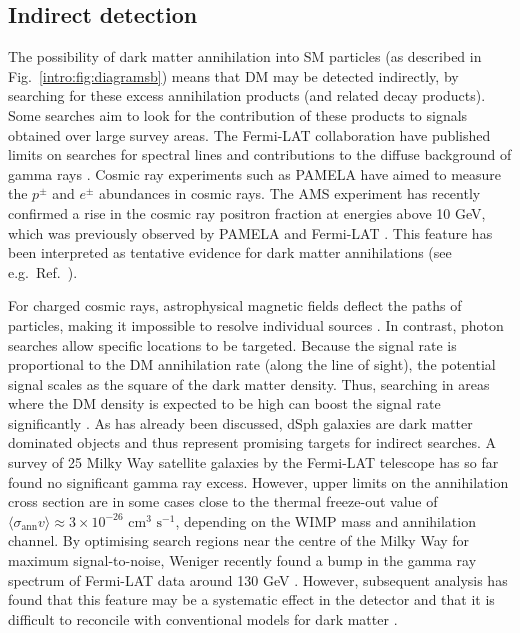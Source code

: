 \subsection{Indirect detection}


The possibility of dark matter annihilation into SM particles (as described in Fig.~\ref{intro:fig:diagramsb}) means that DM may be detected indirectly, by searching for these excess annihilation products (and related decay products). Some searches aim to look for the contribution of these products to signals obtained over large survey areas. The Fermi-LAT collaboration have published limits on searches for spectral lines and contributions to the diffuse background of gamma rays \cite{Ackermann:2012}. Cosmic ray experiments such as PAMELA \cite{Boezio:2009} have aimed to measure the $p^{\pm}$ and $e^{\pm}$ abundances in cosmic rays. The AMS experiment \cite{Aguilar:2013} has recently confirmed a rise in the cosmic ray positron fraction at energies above 10 GeV, which was previously observed by PAMELA \cite{Adriani:2010} and Fermi-LAT \cite{Ackermann:2012b}. This feature has been interpreted as tentative evidence for dark matter annihilations (see e.g.~Ref.~\cite{Ibarra:2014}).

For charged cosmic rays, astrophysical magnetic fields deflect the paths of particles, making it impossible to resolve individual sources \cite{Medina:1998}. In contrast, photon searches allow specific locations to be targeted. Because the signal rate is proportional to the DM annihilation rate (along the line of sight), the potential signal scales as the square of the dark matter density. Thus, searching in areas where the DM density is expected to be high can boost the signal rate significantly \cite{Lavalle:2008}. As has already been discussed, dSph galaxies are dark matter dominated objects and thus represent promising targets for indirect searches. A survey of 25 Milky Way satellite galaxies by the Fermi-LAT telescope \cite{Ackermann:2014} has so far found no significant gamma ray excess. However, upper limits on the annihilation cross section are in some cases close to the thermal freeze-out value of $\langle \sigma_\mathrm{ann} v \rangle \approx 3 \times 10^{-26} \textrm{ cm}^{3} \textrm{ s}^{-1}$, depending on the WIMP mass and annihilation channel. By optimising search regions near the centre of the Milky Way for maximum signal-to-noise, Weniger recently found a bump in the gamma ray spectrum of Fermi-LAT data around 130 GeV \cite{Weniger:2012}. However, subsequent analysis has found that this feature may be a systematic effect in the detector \cite{Bloom:2013} and that it is difficult to reconcile with conventional models for dark matter \cite{Buchmuller:2012, Cohen:2012}.

